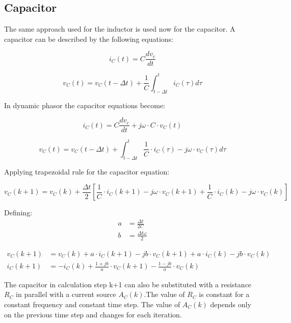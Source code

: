 \subsection{Capacitor} \label{ResistiveCompanionCapacitor}

The same approach used for the inductor is used now for the capacitor.
A capacitor can be described by the following equations:

\begin{equation}
	i_C(t)= C \frac{d v_c}{dt}
\end{equation}

\begin{equation}
	v_C(t)= v_C(t - \Delta t) + \frac{1}{C} \int_{t - \Delta t}^{t} i_C (\tau) d \tau
\end{equation}

In dynamic phasor the capacitor equations become:

\begin{equation}
        i_C(t)= C \frac{d v_c}{dt} + j \omega \cdot C \cdot v_C(t)
\end{equation}

\begin{equation}
        v_C(t) = v_C(t- \Delta t) +  \int_{t- \Delta t}^{t} \frac{1}{C} \cdot i_C(\tau) -j \omega \cdot v_C(\tau)d \tau 
\end{equation}

Applying trapezoidal rule for the capacitor equation:

\begin{equation}
        v_C(k+1) = v_C(k) + \frac{\Delta t}{2} \left[ \frac{1}{C} \cdot i_C(k+1) - j \omega \cdot v_C(k+1) + \frac{1}{C} \cdot i_C(k) - j \omega \cdot v_C(k) \right]
\end{equation}

Defining:
\begin{align}
        a &= \frac{\Delta t}{2C} \\
        b &= \frac{\Delta t \omega}{2}
\end{align}

\begin{align}
        v_C(k+1) &= v_C(k) + a \cdot i_C(k+1) - j b \cdot v_C(k+1) + a \cdot i_C(k) - j b \cdot v_C(k) \\
        i_C(k+1) &= -i_C(k) + \frac{1+jb}{a} \cdot v_C(k+1) - \frac{1-jb}{a} \cdot v_C(k)
\end{align}

The capacitor in calculation step k+1 can also be substituted with a resistance $R_C$ in parallel with a current source $A_C(k)$.The value of $R_C$ is constant for a constant frequency and constant time step. The value of $A_C(k)$ depends only on the previous time step and changes for each iteration.

